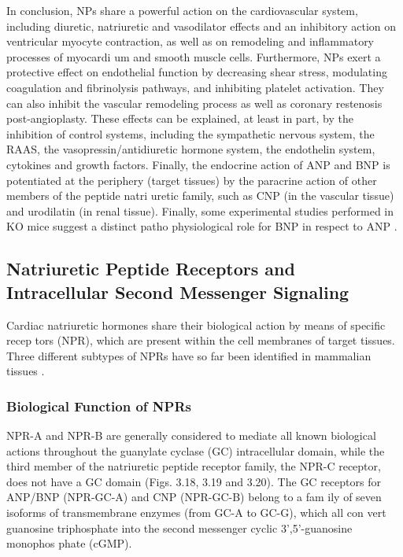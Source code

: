 \documentclass[14pt,a4paper,onecolumn]{extarticle}
\begin{document}
In conclusion, NPs share a powerful action on the cardiovascular system, including diuretic, natriuretic and vasodilator effects and an inhibitory action on ventricular myocyte contraction, as well as on remodeling and inflammatory processes of myocardi um and smooth muscle cells. Furthermore, NPs exert a protective effect on endothelial function by decreasing shear stress, modulating coagulation and fibrinolysis pathways, and inhibiting platelet activation. They can also inhibit the vascular remodeling process as well as coronary restenosis post-angioplasty. These effects can be explained, at least in part, by the inhibition of control systems, including the sympathetic nervous system, the RAAS, the vasopressin/antidiuretic hormone system, the endothelin system, cytokines and growth factors. Finally, the endocrine action of ANP and BNP is potentiated at the periphery (target tissues) by the paracrine action of other members of the peptide natri uretic family, such as CNP (in the vascular tissue) and urodilatin (in renal tissue).  Finally, some experimental studies performed in KO mice suggest a distinct patho physiological role for BNP in respect to ANP \citep{18}.



\subsection{Natriuretic Peptide Receptors and Intracellular Second Messenger Signaling}

Cardiac natriuretic hormones share their biological action by means of specific recep tors (NPR), which are present within the cell membranes of target tissues. Three different subtypes of NPRs have so far been identified in mammalian tissues \citep{112} \citep{165}.



\subsubsection{Biological Function of NPRs}



NPR-A and NPR-B are generally considered to mediate all known biological actions throughout the guanylate cyclase (GC) intracellular domain, while the third member of the natriuretic peptide receptor family, the NPR-C receptor, does not have a GC domain (Figs. 3.18, 3.19 and 3.20).  The GC receptors for ANP/BNP (NPR-GC-A) and CNP (NPR-GC-B) belong to a fam ily of seven isoforms of transmembrane enzymes (from GC-A to GC-G), which all con vert guanosine triphosphate into the second messenger cyclic 3’,5’-guanosine monophos phate (cGMP).
\end{document}
